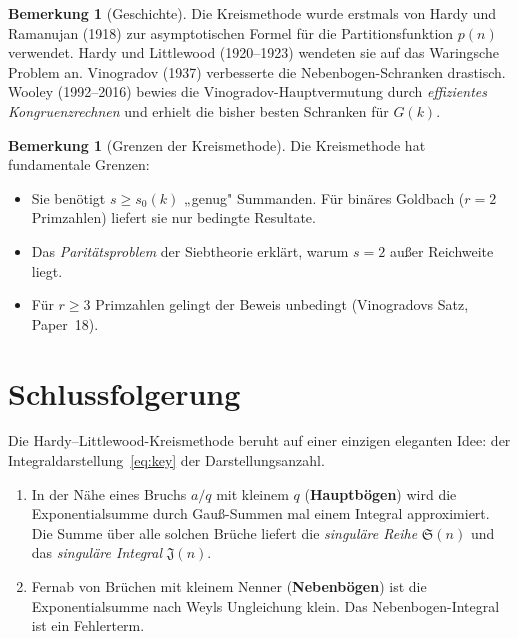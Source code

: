 \documentclass[12pt,a4paper]{amsart}
\theoremstyle{definition}
\newtheorem{bemerkung}[theorem]{Bemerkung}
\begin{document}
\begin{bemerkung}[Geschichte]
  Die Kreismethode wurde erstmals von Hardy und Ramanujan (1918) zur
  asymptotischen Formel für die Partitionsfunktion $p(n)$ verwendet.
  Hardy und Littlewood (1920--1923) wendeten sie auf das Waringsche
  Problem an.  Vinogradov (1937) verbesserte die Nebenbogen-Schranken
  drastisch.  Wooley (1992--2016) bewies die Vinogradov-Hauptvermutung
  durch \emph{effizientes Kongruenzrechnen} und erhielt die bisher
  besten Schranken für $G(k)$.
\end{bemerkung}

\begin{bemerkung}[Grenzen der Kreismethode]
  Die Kreismethode hat fundamentale Grenzen:
  \begin{itemize}
    \item Sie benötigt $s \geq s_0(k)$ „genug" Summanden.  Für binäres
      Goldbach ($r = 2$ Primzahlen) liefert sie nur bedingte Resultate.
    \item Das \emph{Paritätsproblem} der Siebtheorie erklärt, warum
      $s = 2$ außer Reichweite liegt.
    \item Für $r \geq 3$ Primzahlen gelingt der Beweis unbedingt
      (Vinogradovs Satz, Paper~18).
  \end{itemize}
\end{bemerkung}

\section{Schlussfolgerung}

Die Hardy--Littlewood-Kreismethode beruht auf einer einzigen eleganten
Idee: der Integraldarstellung~\eqref{eq:key} der Darstellungsanzahl.

\begin{enumerate}
  \item In der Nähe eines Bruchs $a/q$ mit kleinem $q$
    (\textbf{Hauptbögen}) wird die Exponentialsumme durch
    Gauß-Summen mal einem Integral approximiert.  Die Summe über
    alle solchen Brüche liefert die \emph{singuläre Reihe} $\mathfrak{S}(n)$
    und das \emph{singuläre Integral} $\mathfrak{J}(n)$.
  \item Fernab von Brüchen mit kleinem Nenner (\textbf{Nebenbögen})
    ist die Exponentialsumme nach Weyls Ungleichung klein.
    Das Nebenbogen-Integral ist ein Fehlerterm.
\end{enumerate}
\end{document}
